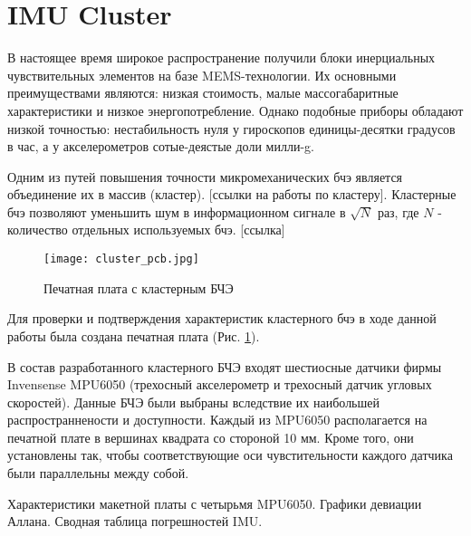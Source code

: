 \section {IMU Cluster}
В настоящее время широкое распространение получили блоки инерциальных чувствительных элементов на базе MEMS-технологии.
Их основными преимуществами являются: низкая стоимость, малые массогабаритные характеристики и низкое энергопотребление.
Однако подобные приборы обладают низкой точностью: нестабильность нуля у гироскопов единицы-десятки градусов в час, а у акселерометров сотые-деястые доли милли-g.

Одним из путей повышения точности микромеханических бчэ является объединение их в массив (кластер). [ссылки на работы по кластеру].
Кластерные бчэ позволяют уменьшить шум в информационном сигнале в $\sqrt{N}$ раз, где $N$ - количество отдельных используемых бчэ. [ссылка]

\newpage

\begin{figure}[h!]
	\centering
	\texttt{[image: cluster\_pcb.jpg]}
	\caption{Печатная плата с кластерным БЧЭ}
	\label{fig:cluster_pcb}
\end{figure}

Для проверки и подтверждения характеристик кластерного бчэ в ходе данной работы была создана печатная плата (Рис. \ref{fig:cluster_pcb}).

В состав разработанного кластерного БЧЭ входят шестиосные датчики фирмы Invensense MPU6050 (трехосный акселерометр и трехосный датчик угловых скоростей).
Данные БЧЭ были выбраны вследствие их наибольшей распространнености и доступности.
Каждый из MPU6050 располагается на печатной плате в вершинах квадрата со стороной 10 мм.
Кроме того, они установлены так, чтобы соответствующие оси чувстительности каждого датчика были параллельны между собой.

Характеристики макетной платы с четырьмя MPU6050. Графики девиации Аллана. Сводная таблица погрешностей IMU.